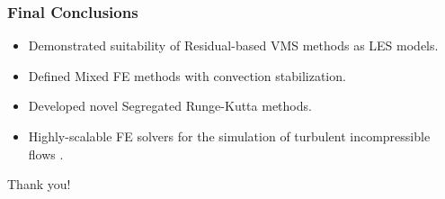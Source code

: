 \begin{frame}
\frametitle{Final Conclusions}
\vfill
\begin{itemize}
\item<1-> Demonstrated suitability of \alert<1>{Residual-based VMS methods as LES models}.
\item<2-> Defined \alert<2>{Mixed FE methods with convection stabilization}.
\item<3-> Developed novel \alert<3>{Segregated Runge-Kutta methods}. 
\item<4-> \alert<4>{Highly-scalable FE solvers} for the simulation of turbulent incompressible flows .
\end{itemize}
\vfill
\end{frame}
\begin{frame}
\vfill
\begin{center}
{\huge Thank you!}
\end{center}
\vfill
\end{frame}